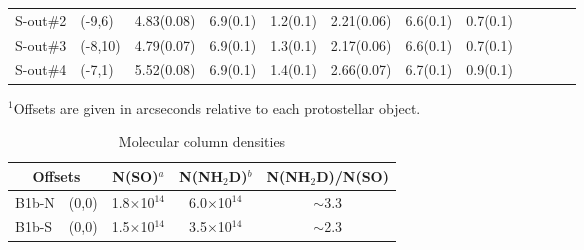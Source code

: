 \documentclass[letter]{aa}
\begin{document}
\begin{appendix}
\begin{table*}
\begin{tabular}{l|l|ccc|ccc|cccc}
% 
{\small S-out\#2}  & {\small (-9,6)}  &  {\small 4.83(0.08)} & {\small 6.9(0.1)} & {\small 1.2(0.1)} & {\small 2.21(0.06)} & 
{\small 6.6(0.1)} &  {\small 0.7(0.1)} &                     &                  &                    &  
\\   
%
%
{\small S-out\#3}  & {\small (-8,10)} &  {\small 4.79(0.07)} & {\small 6.9(0.1)} &  {\small 1.3(0.1)} & {\small 2.17(0.06)} & 
{\small 6.6(0.1)} &  {\small 0.7(0.1)} &                     &                    &                   &  \\
%
{\small S-out\#4}  & {\small (-7,1)}  &  {\small 5.52(0.08)} &  {\small 6.9(0.1)} &  {\small 1.4(0.1)} & {\small 2.66(0.07)} & 
{\small 6.7(0.1)} &  {\small 0.9(0.1)} &                     &                    &                    &  
\\ 
\hline
\hline
\end{tabular}

\noindent
{\small $^1$Offsets are given in arcseconds relative to each protostellar object.}

\end{table*}


\begin{table*}
\caption{Molecular column densities}
\label{TableA3}
\begin{tabular}{lcccc}
\hline
\multicolumn{2}{c}{Offsets} & \multicolumn{1}{c}{N(SO)$^a$} &  
\multicolumn{1}{c}{N(NH$_2$D)$^b$}  & \multicolumn{1}{c}{N(NH$_2$D)/N(SO)}
\\ 
 \hline
B1b-N   & (0,0)    &   1.8$\times$10$^{14}$  &    6.0$\times$10$^{14}$  &  $\sim$3.3  \\ 
%
%
B1b-S   & (0,0)    &   1.5$\times$10$^{14}$  &    3.5$\times$10$^{14}$  &  $\sim$2.3    \\
%
% 
%
%
\hline \hline
\end{tabular}


\end{table*}
\end{appendix}
\end{document}
